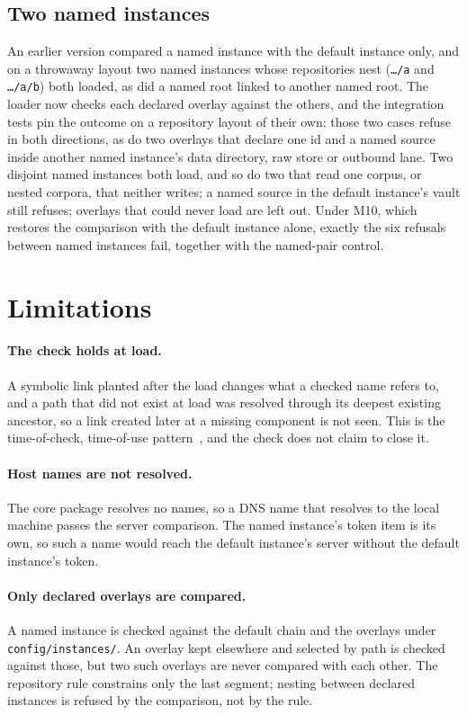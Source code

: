 \documentclass[11pt]{article}
\theoremstyle{plain}
\theoremstyle{definition}
\theoremstyle{remark}
\begin{document}
\subsection{Two named instances}\label{sec:pairs}
An earlier version compared a named instance with the default instance only, and on a throwaway
layout two named instances whose repositories nest (\texttt{\dots/a} and \texttt{\dots/a/b}) both
loaded, as did a named root linked to another named root. The loader now checks each declared
overlay against the others, and the integration tests pin the outcome on a repository layout of
their own: those two cases refuse in both directions, as do two overlays that declare one id and a
named source inside another named instance's data directory, raw store or outbound lane. Two
disjoint named instances both load, and so do two that read one corpus, or nested corpora, that
neither writes; a named source in the default instance's vault still refuses; overlays that could
never load are left out. Under M10, which restores the comparison with the default instance alone,
exactly the six refusals between named instances fail, together with the named-pair control.

\section{Limitations}\label{sec:limits}

\paragraph{The check holds at load.} A symbolic link planted after the load changes what a checked
name refers to, and a path that did not exist at load was resolved through its deepest existing
ancestor, so a link created later at a missing component is not seen. This is the time-of-check,
time-of-use pattern~\cite{bishop1996}, and the check does not claim to close it.

\paragraph{Host names are not resolved.} The core package resolves no names, so a DNS name that
resolves to the local machine passes the server comparison. The named instance's token item is its
own, so such a name would reach the default instance's server without the default instance's
token.

\paragraph{Only declared overlays are compared.} A named instance is checked against the default chain
and the overlays under \texttt{config/instances/}. An overlay kept elsewhere and selected by path is
checked against those, but two such overlays are never compared with each other. The repository
rule constrains only the last segment; nesting between declared instances is refused by the
comparison, not by the rule.
\end{document}

